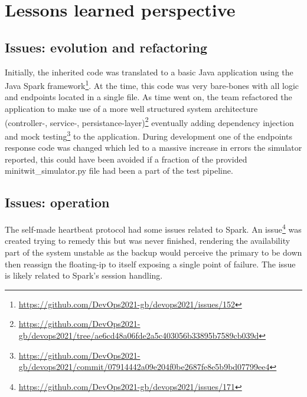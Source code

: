 \section{Lessons learned perspective} \label{section:Lessons learned perspective}
\subsection{Issues: evolution and refactoring}
Initially, the inherited code was translated to a basic Java application using the Java Spark framework\footnote{\url{https://github.com/DevOps2021-gb/devops2021/issues/152}}. At the time, this code was very bare-bones with all logic and endpoints located in a single file. As time went on, the team refactored the application to make use of a more well structured system architecture (controller-, service-, persistance-layer)\footnote{\url{https://github.com/DevOps2021-gb/devops2021/tree/ae6cd48a06fde2a5c403056b33895b7589cb039d}} eventually adding dependency injection and mock testing\footnote{\url{https://github.com/DevOps2021-gb/devops2021/commit/07914442a09e204f0be2687fe8e5b9bd07799ee4}} to the application. 
During development one of the endpoints response code was changed which led to a massive increase in errors the simulator reported, this could have been avoided if a fraction of the provided minitwit\_simulator.py file had been a part of the test pipeline.

\subsection{Issues: operation}
The self-made heartbeat protocol had some issues related to Spark. An issue\footnote{\url{https://github.com/DevOps2021-gb/devops2021/issues/171}} was created trying to remedy this but was never finished, rendering the availability part of the system unstable as the backup would perceive the primary to be down then reassign the floating-ip to itself exposing a single point of failure. The issue is likely related to Spark's session handling.


